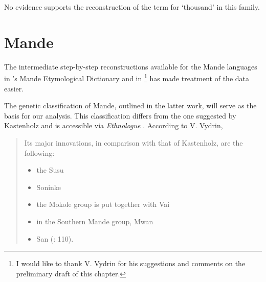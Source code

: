No evidence supports the reconstruction of the term for ‘thousand’ in this family.

\clearpage 
\section{Mande}%

 The intermediate step-by-step reconstructions available for the Mande languages in \citeauthor{Vydrinms}’s Mande Etymological Dictionary  and in \citealt{Vydrin2007}\footnote{I would like to thank V. Vydrin for his suggestions and comments on the preliminary draft of this chapter.}  has made treatment of the data easier.

 The genetic classification of Mande, outlined in the latter work, will serve as the basis for our analysis. This classification differs from the one suggested by Kastenholz and is accessible via \textit{Ethnologue} \citep{SimonsFenning2018}. According to V. Vydrin, 
 
 \begin{quote}
 {Its major innovations, in comparison with that of Kastenholz, are the following:} 

 \begin{itemize} 
\item {the Susu}

\item { Soninke} 

\item { the Mokole group is put together with Vai} 

\item { in the Southern Mande group, Mwan} 

\item {San} {(}\citealt{Vydrin2016}: 110).
 \end{itemize}
 
 \end{quote}


